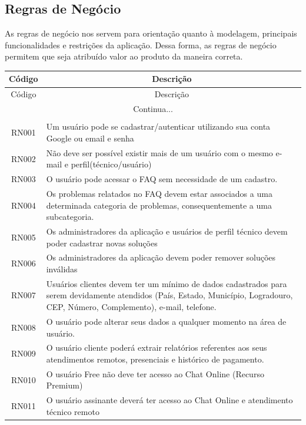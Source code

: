 \documentclass[
    12pt,               %
    openright,          %
    oneside,
    a4paper,            %
    MODELO,             %
    english,            %
    brazil              %
   ]{ifsp-spo-inf-ctds}
\begin{document}
\subsection{Regras de Negócio}
As regras de negócio nos servem para orientação quanto à modelagem, principais funcionalidades e restrições da aplicação. Dessa forma, as regras de negócio permitem que seja atribuído valor ao produto da maneira correta.  

\begin{center}
\begin{longtable}{|c|p{14cm}|}
\hline
Código & \multicolumn{1}{c|}{Descrição} \\ \hline
\endfirsthead
Código & \multicolumn{1}{c|}{Descrição} \\ \hline
\endhead
\multicolumn{2}{1}{Continua...}\\
\endfoot
\hline
\multicolumn{2}{c}{Fonte: Os autores}\\
\endlastfoot
RN001 & Um usuário pode se cadastrar/autenticar utilizando sua conta Google ou email e senha \\ \hline
RN002 & Não deve ser possível existir mais de um usuário com o mesmo e-mail e perfil(técnico/usuário) \\ \hline
RN003 & O usuário pode acessar o FAQ sem necessidade de um cadastro. \\ \hline
RN004 & Os problemas relatados no FAQ devem estar associados a uma determinada categoria de problemas, consequentemente a uma subcategoria. \\ \hline
RN005 & Os administradores da aplicação e usuários de perfil técnico devem poder cadastrar novas soluções \\ \hline
RN006 & Os administradores da aplicação devem poder remover soluções inválidas \\ \hline
RN007 & Usuários clientes devem ter um mínimo de dados cadastrados para serem devidamente atendidos (País, Estado, Município, Logradouro, CEP, Número, Complemento), e-mail, telefone. \\ \hline
RN008 & O usuário pode alterar seus dados a qualquer momento na área de usuário. \\ \hline
RN009 & O usuário cliente poderá extrair relatórios referentes aos seus atendimentos remotos, presenciais e histórico de pagamento. \\ \hline
RN010 & O usuário Free não deve ter acesso ao Chat Online (Recurso Premium) \\ \hline
RN011 & O usuário assinante deverá ter acesso ao Chat Online e atendimento técnico remoto \\ \hline

\end{longtable}
\end{center}
\end{document}
